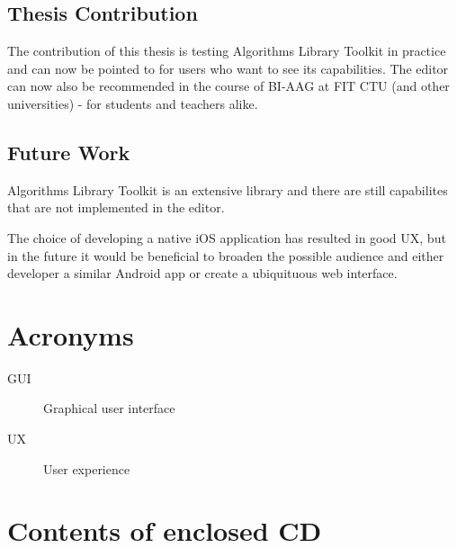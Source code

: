 \documentclass[thesis=B,english]{FITthesis}[2019/12/23]
\begin{document}
\section{Thesis Contribution}

The contribution of this thesis is testing Algorithms Library Toolkit in practice and can now be pointed to for users who want to see its capabilities. The editor can now also be recommended in the course of BI-AAG at FIT CTU (and other universities) - for students and teachers alike.

\section{Future Work}

Algorithms Library Toolkit is an extensive library and there are still capabilites that are not implemented in the editor.

The choice of developing a native iOS application has resulted in good UX, but in the future it would be beneficial to broaden the possible audience and either developer a similar Android app or create a ubiquituous web interface.





\appendix

\chapter{Acronyms}
\begin{description}
	\item[GUI] Graphical user interface 
	\item[UX] User experience 
\end{description}


\chapter{Contents of enclosed CD}


\begin{figure}
\end{figure}
\end{document}
